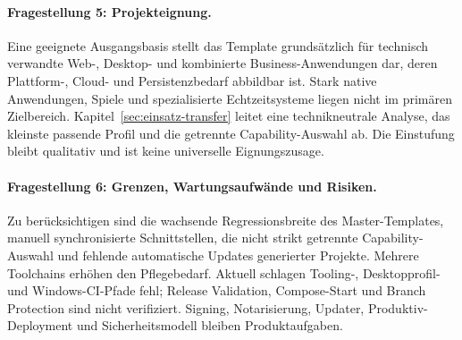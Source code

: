 \paragraph{Fragestellung 5: Projekteignung.}
Eine geeignete Ausgangsbasis stellt das Template grundsätzlich für technisch
verwandte Web-, Desktop- und kombinierte Business-Anwendungen dar, deren
Plattform-, Cloud- und Persistenzbedarf abbildbar ist. Stark native Anwendungen,
Spiele und spezialisierte Echtzeitsysteme liegen nicht im primären Zielbereich.
Kapitel~\ref{sec:einsatz-transfer} leitet eine technikneutrale Analyse, das
kleinste passende Profil und die getrennte Capability-Auswahl ab. Die
Einstufung bleibt qualitativ und ist keine universelle Eignungszusage.

\paragraph{Fragestellung 6: Grenzen, Wartungsaufwände und Risiken.}
Zu berücksichtigen sind die wachsende Regressionsbreite des Master-Templates,
manuell synchronisierte Schnittstellen, die nicht strikt getrennte
Capability-Auswahl und fehlende automatische Updates generierter Projekte.
Mehrere Toolchains erhöhen den Pflegebedarf. Aktuell schlagen Tooling-,
Desktopprofil- und Windows-CI-Pfade fehl; Release Validation, Compose-Start
und Branch Protection sind nicht verifiziert. Signing, Notarisierung, Updater,
Produktiv-Deployment und Sicherheitsmodell bleiben Produktaufgaben.
